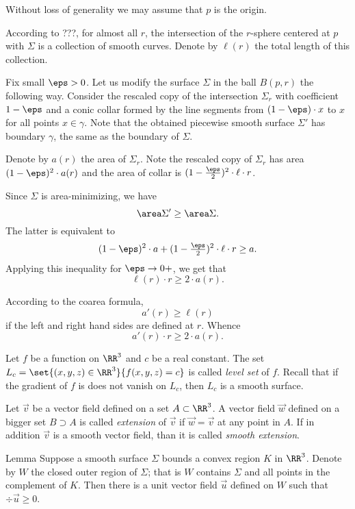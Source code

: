 Without loss of generality we may assume that $p$ is the origin.

According to ???, for almost all $r$, the intersection of the $r$-sphere centered at $p$ with $\Sigma$ is a collection of smooth curves.
Denote by $\ell(r)$ the total length of this collection.

Fix small $\eps>0$.
Let us modify the surface $\Sigma$ in the ball $B(p,r)$ the following way.
Consider the rescaled copy of the intersection $\Sigma_r$ with coefficient $1-\eps$ and a conic collar 
formed by the line segments from $(1-\eps)\cdot x$ to $x$ for all points $x\in\gamma$.
Note that the obtained piecewise smooth surface $\Sigma'$ has boundary $\gamma$, the same as the boundary of $\Sigma$.

Denote by $a(r)$ the area of $\Sigma_r$.
Note the rescaled copy of $\Sigma_r$ has area $(1-\eps)^2\cdot a(r)$
and the area of collar is $(1-\tfrac\eps2)^2\cdot\ell\cdot r$.

Since $\Sigma$ is area-minimizing, we have
\[\area\Sigma'\ge \area \Sigma.\]
The latter is equivalent to 
\[(1-\eps)^2\cdot a+(1-\tfrac\eps2)^2\cdot\ell\cdot r\ge a.\]
Applying this inequality for $\eps\to 0+$, we get that
\[\ell(r)\cdot r\ge 2\cdot a(r).\]

According to the coarea formula, 
\[a'(r)\ge \ell(r)\]
if the left and right hand sides are defined at $r$.
Whence 
\[a'(r)\cdot r\ge 2\cdot a(r).\]




















Let $f$ be a function on $\RR^3$ and $c$ be a real constant.
The set $L_c=\set{(x,y,z)\in\RR^3}{f(x,y,z)=c}$ is called \emph{level set} of $f$.
Recall that if the gradient of $f$ is does not vanish on $L_c$, then $L_c$ is a smooth surface.

Let $\vec v$ be a vector field defined on a set $A\subset \RR^3$.
A vector field $\vec w$ defined on a bigger set $B\supset A$
is called \emph{extension} of $\vec v$ if $\vec w=\vec v$ at any point in $A$.
If in addition $\vec v$ is a smooth vector field, than it is called \emph{smooth extension}. 


\begin{thm}{Lemma}
Suppose a smooth surface $\Sigma$ bounds a convex region $K$ in $\RR^3$.
Denote by $W$ the closed outer region of $\Sigma$; that is $W$ contains $\Sigma$ and all points in the complement of $K$.  
Then there is a unit vector field $\vec u$ defined on $W$ such that 
$\div \vec u\ge 0$.
\end{thm}

